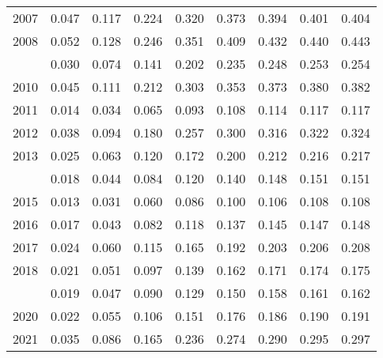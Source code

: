 \documentclass[
]{article}
\begin{document}
\begin{longtable}[t]{lrrrrrrrr}
2007 & 0.047 & 0.117 & 0.224 & 0.320 & 0.373 & 0.394 & 0.401 & 0.404\\
2008 & 0.052 & 0.128 & 0.246 & 0.351 & 0.409 & 0.432 & 0.440 & 0.443\\
\addlinespace
2009 & 0.030 & 0.074 & 0.141 & 0.202 & 0.235 & 0.248 & 0.253 & 0.254\\
2010 & 0.045 & 0.111 & 0.212 & 0.303 & 0.353 & 0.373 & 0.380 & 0.382\\
2011 & 0.014 & 0.034 & 0.065 & 0.093 & 0.108 & 0.114 & 0.117 & 0.117\\
2012 & 0.038 & 0.094 & 0.180 & 0.257 & 0.300 & 0.316 & 0.322 & 0.324\\
2013 & 0.025 & 0.063 & 0.120 & 0.172 & 0.200 & 0.212 & 0.216 & 0.217\\
\addlinespace
2014 & 0.018 & 0.044 & 0.084 & 0.120 & 0.140 & 0.148 & 0.151 & 0.151\\
2015 & 0.013 & 0.031 & 0.060 & 0.086 & 0.100 & 0.106 & 0.108 & 0.108\\
2016 & 0.017 & 0.043 & 0.082 & 0.118 & 0.137 & 0.145 & 0.147 & 0.148\\
2017 & 0.024 & 0.060 & 0.115 & 0.165 & 0.192 & 0.203 & 0.206 & 0.208\\
2018 & 0.021 & 0.051 & 0.097 & 0.139 & 0.162 & 0.171 & 0.174 & 0.175\\
\addlinespace
2019 & 0.019 & 0.047 & 0.090 & 0.129 & 0.150 & 0.158 & 0.161 & 0.162\\
2020 & 0.022 & 0.055 & 0.106 & 0.151 & 0.176 & 0.186 & 0.190 & 0.191\\
2021 & 0.035 & 0.086 & 0.165 & 0.236 & 0.274 & 0.290 & 0.295 & 0.297\\*
\end{longtable}
\end{document}
